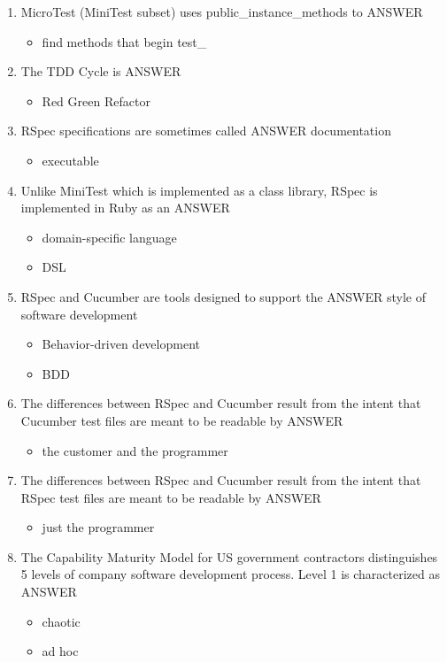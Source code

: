 \documentclass{exam}
\begin{document}
\begin{enumerate}
\item MicroTest (MiniTest subset) uses public\_instance\_methods to ANSWER
\begin{itemize}
\item find methods that begin test\_
\end{itemize}
\item The TDD Cycle is ANSWER
\begin{itemize}
\item Red Green Refactor
\end{itemize}
\item RSpec specifications are sometimes called ANSWER documentation
\begin{itemize}
\item executable
\end{itemize}
\item Unlike MiniTest which is implemented as a class library, RSpec is implemented in Ruby as an ANSWER
\begin{itemize}
\item domain-specific language
\item DSL
\end{itemize}
\item RSpec and Cucumber are tools designed to support the ANSWER style of software development
\begin{itemize}
\item Behavior-driven development
\item BDD
\end{itemize}
\item The differences between RSpec and Cucumber result from the intent that Cucumber test files are meant to be readable by ANSWER
\begin{itemize}
\item the customer and the programmer
\end{itemize}
\item The differences between RSpec and Cucumber result from the intent that RSpec test files are meant to be readable by ANSWER
\begin{itemize}
\item just the programmer
\end{itemize}
\item The Capability Maturity Model for US government contractors distinguishes 5 levels of company software development process.  Level 1 is characterized as ANSWER
\begin{itemize}
\item chaotic
\item ad hoc

\end{itemize}
\end{enumerate}
\end{document}
